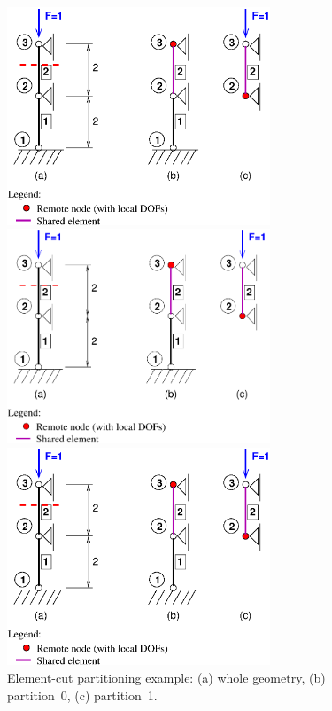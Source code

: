\documentclass[a4paper]{article}
\begin{document}
\begin{figure}[htb]
\begin{htmlonly}
  \centerline{\includegraphics[width=0.7\textwidth]{poofem_ex02.eps}}
\end{htmlonly}
\ifpdf
\centerline{\includegraphics[width=0.7\textwidth]{poofem_ex02.pdf}}
\else
\centerline{\includegraphics[width=0.7\textwidth]{poofem_ex02.eps}}
\fi
\caption{Element-cut partitioning example: (a) whole geometry,
(b) partition~0, (c) partition~1.}
\label{elmentcut-ex02}
\end{figure}
\end{document}
